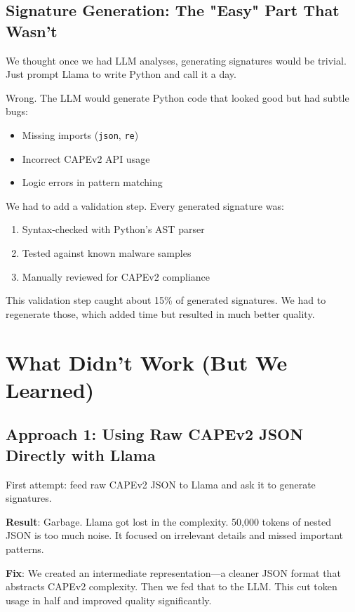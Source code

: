 \documentclass[11pt]{article}
\begin{document}
\subsection{Signature Generation: The "Easy" Part That Wasn't}

We thought once we had LLM analyses, generating signatures would be trivial. Just prompt Llama to write Python and call it a day.

Wrong. The LLM would generate Python code that looked good but had subtle bugs:
\begin{itemize}
    \item Missing imports (\texttt{json}, \texttt{re})
    \item Incorrect CAPEv2 API usage
    \item Logic errors in pattern matching
\end{itemize}

We had to add a validation step. Every generated signature was:
\begin{enumerate}
    \item Syntax-checked with Python's AST parser
    \item Tested against known malware samples
    \item Manually reviewed for CAPEv2 compliance
\end{enumerate}

This validation step caught about 15\% of generated signatures. We had to regenerate those, which added time but resulted in much better quality.

\section{What Didn't Work (But We Learned)}

\subsection{Approach 1: Using Raw CAPEv2 JSON Directly with Llama}

First attempt: feed raw CAPEv2 JSON to Llama and ask it to generate signatures. 

\textbf{Result}: Garbage. Llama got lost in the complexity. 50,000 tokens of nested JSON is too much noise. It focused on irrelevant details and missed important patterns.

\textbf{Fix}: We created an intermediate representation—a cleaner JSON format that abstracts CAPEv2 complexity. Then we fed that to the LLM. This cut token usage in half and improved quality significantly.
\end{document}
